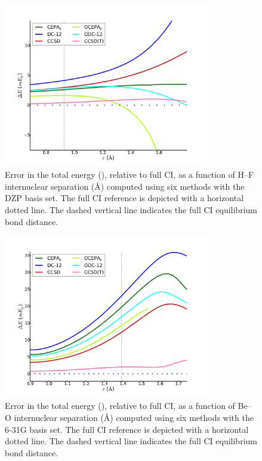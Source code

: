 \begin{figure}
	\centering
	\includegraphics[width=0.8\textwidth]{figures/hf.pdf}
	\caption{%
        \label{hf-f}
        Error in the total energy (\mhartree), relative to full CI, as a
        function of H--F internuclear separation (\AA) computed using six
        methods with the DZP basis set.
        The full CI reference is depicted with a horizontal dotted line.
        The dashed vertical line indicates the full CI equilibrium bond
        distance.
	}
\end{figure}

\begin{figure}
	\centering
	\includegraphics[width=0.8\textwidth]{figures/beo.pdf}
	\caption{%
        \label{beo-f}
        Error in the total energy (\mhartree), relative to full CI, as a
        function of Be--O internuclear separation (\AA) computed using six
        methods with the 6-31G basis set.
        The full CI reference is depicted with a horizontal dotted line.
        The dashed vertical line indicates the full CI equilibrium bond
        distance.
	}
\end{figure}

